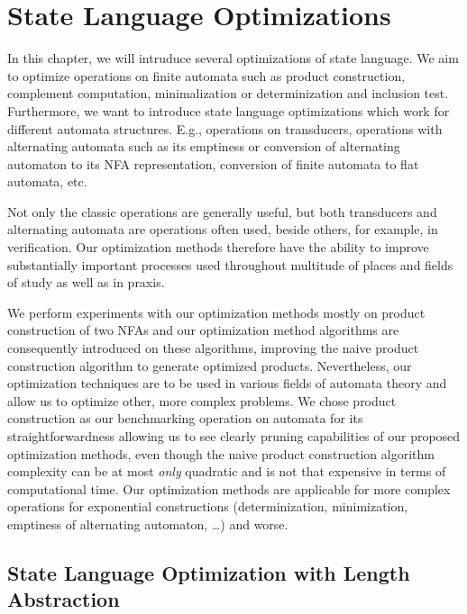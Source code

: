 \chapter{State Language Optimizations}

In this chapter, we will intruduce several optimizations of state language. We aim to optimize operations on finite automata such as product construction, complement computation, minimalization or determinization and inclusion test. Furthermore, we want to introduce state language optimizations which work for different automata structures. E.g., operations on transducers, operations with alternating automata such as its emptiness or conversion of alternating automaton to its NFA representation, conversion of finite automata to flat automata, etc.

Not only the classic operations are generally useful, but both transducers and alternating automata are operations often used, beside others, for example, in verification. Our optimization methods therefore have the ability to improve substantially important processes used throughout multitude of places and fields of study as well as in praxis.

We perform experiments with our optimization methods mostly on product construction of two NFAs and our optimization method algorithms are consequently introduced on these algorithms, improving the naive product construction algorithm to generate optimized products. Nevertheless, our optimization techniques are to be used in various fields of automata theory and allow us to optimize other, more complex problems. We chose product construction as our benchmarking operation on automata for its straightforwardness allowing us to see clearly pruning capabilities of our proposed optimization methods, even though the naive product construction algorithm complexity can be at most \emph{only} quadratic and is not that expensive in terms of computational time. Our optimization methods are applicable for more complex operations for exponential constructions (determinization, minimization, emptiness of alternating automaton, \ldots) and worse.


\section{State Language Optimization with Length Abstraction}

